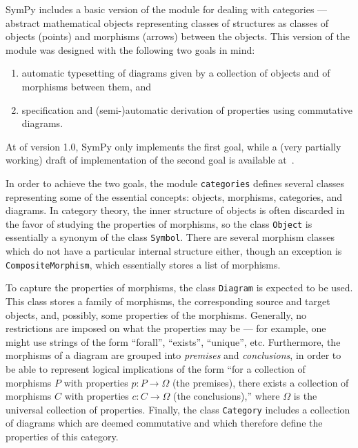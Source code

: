 SymPy includes a basic version of the module for dealing with categories ---
abstract mathematical objects representing classes of structures as classes of
objects (points) and morphisms (arrows) between the objects.  This version of
the module was designed with the following two goals in mind:

\begin{enumerate}
\item automatic typesetting of diagrams given by a collection of
  objects and of morphisms between them, and
\item specification and (semi-)automatic derivation of properties
  using commutative diagrams.
\end{enumerate}

At of version 1.0, SymPy only implements the first goal, while a (very partially
working) draft of implementation of the second goal is available
at~\cite{ct4commutativity}.

In order to achieve the two goals, the module \texttt{categories} defines
several classes representing some of the essential concepts: objects, morphisms,
categories, and diagrams.  In category theory, the inner structure of objects is
often discarded in the favor of studying the properties of morphisms, so the
class \texttt{Object} is essentially a synonym of the class \texttt{Symbol}.
There are several morphism classes which do not have a particular internal
structure either, though an exception is \texttt{CompositeMorphism}, which
essentially stores a list of morphisms.

To capture the properties of morphisms, the class \texttt{Diagram} is expected
to be used.  This class stores a family of morphisms, the corresponding source
and target objects, and, possibly, some properties of the morphisms.  Generally,
no restrictions are imposed on what the properties may be --- for example, one
might use strings of the form ``forall'', ``exists'', ``unique'', etc.
Furthermore, the morphisms of a diagram are grouped into \textit{premises} and
\textit{conclusions}, in order to be able to represent logical implications of
the form ``for a collection of morphisms $P$ with properties $p:P\to \Omega$ (the
premises), there exists a collection of morphisms $C$ with properties $c:C\to
\Omega$ (the conclusions),'' where $\Omega$ is the universal collection of
properties.  Finally, the class \texttt{Category} includes a collection of
diagrams which are deemed commutative and which therefore define the properties
of this category.


